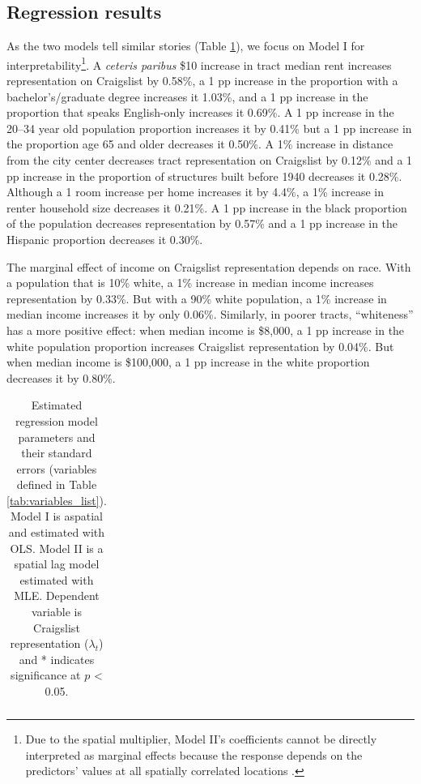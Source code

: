 \documentclass[11pt,letterpaper]{article}
\begin{document}
\subsection{Regression results}

As the two models tell similar stories (Table \ref{tab:regression_results}), we focus on Model I for interpretability\footnote{Due to the spatial multiplier, Model II's coefficients cannot be directly interpreted as marginal effects because the response depends on the predictors' values at all spatially correlated locations \citep[][p. 164]{anselin_modern_2014}.}. A \textit{ceteris paribus} \$10 increase in tract median rent increases representation on Craigslist by 0.58\%, a 1 pp increase in the proportion with a bachelor's/graduate degree increases it 1.03\%, and a 1 pp increase in the proportion that speaks English-only increases it 0.69\%. A 1 pp increase in the 20--34 year old population proportion increases it by 0.41\% but a 1 pp increase in the proportion age 65 and older decreases it 0.50\%. A 1\% increase in distance from the city center decreases tract representation on Craigslist by 0.12\% and a 1 pp increase in the proportion of structures built before 1940 decreases it 0.28\%. Although a 1 room increase per home increases it by 4.4\%, a 1\% increase in renter household size decreases it 0.21\%. A 1 pp increase in the black proportion of the population decreases representation by 0.57\% and a 1 pp increase in the Hispanic proportion decreases it 0.30\%. 

The marginal effect of income on Craigslist representation depends on race. With a population that is 10\% white, a 1\% increase in median income increases representation by 0.33\%. But with a 90\% white population, a 1\% increase in median income increases it by only 0.06\%. Similarly, in poorer tracts, \enquote{whiteness} has a more positive effect: when median income is \$8,000, a 1 pp increase in the white population proportion increases Craigslist representation by 0.04\%. But when median income is \$100,000, a 1 pp increase in the white proportion decreases it by 0.80\%.


\begin{small}
	\begin{longtable}{l r r r r} 
		\caption{Estimated regression model parameters and their standard errors (variables defined in Table \ref{tab:variables_list}). Model I is aspatial and estimated with OLS. Model II is a spatial lag model estimated with MLE. Dependent variable is Craigslist representation ($\lambda_t$) and * indicates significance at $p$ < 0.05.}
		\label{tab:regression_results}
		
	\end{longtable}
\end{small}
\end{document}
